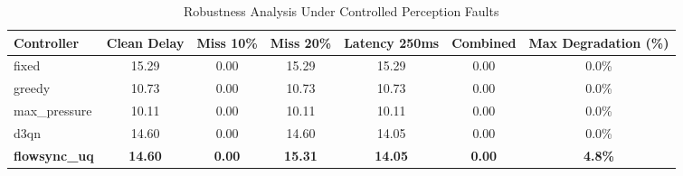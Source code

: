 \begin{table}[t]
\centering
\caption{Robustness Analysis Under Controlled Perception Faults}
\label{tab:robustness_eval}
\begin{tabular}{lcccccc}
\toprule
\textbf{Controller} & \textbf{Clean Delay} & \textbf{Miss 10\%} & \textbf{Miss 20\%} & \textbf{Latency 250ms} & \textbf{Combined} & \textbf{Max Degradation (\%)} \\
\midrule
fixed & 15.29 & 0.00 & 15.29 & 15.29 & 0.00 & 0.0\% \\
greedy & 10.73 & 0.00 & 10.73 & 10.73 & 0.00 & 0.0\% \\
max_pressure & 10.11 & 0.00 & 10.11 & 10.11 & 0.00 & 0.0\% \\
d3qn & 14.60 & 0.00 & 14.60 & 14.05 & 0.00 & 0.0\% \\
\textbf{flowsync_uq} & \textbf{14.60} & \textbf{0.00} & \textbf{15.31} & \textbf{14.05} & \textbf{0.00} & \textbf{4.8\%} \\
\bottomrule
\end{tabular}
\end{table}